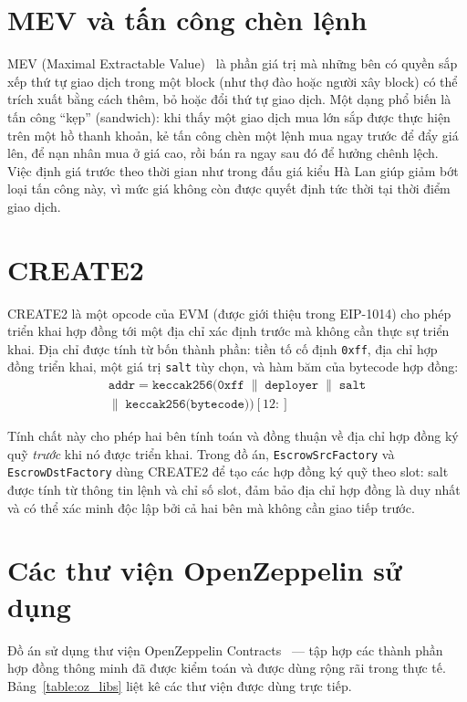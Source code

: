 \documentclass[../DoAn.tex]{subfiles}
\begin{document}
\section{MEV và tấn công chèn lệnh}
\label{apdx:mev}

MEV (Maximal Extractable Value)~\cite{daian2020flashboys, qin2022quantifying} là phần giá trị mà những bên có quyền sắp xếp thứ tự giao dịch trong một block (như thợ đào hoặc người xây block) có thể trích xuất bằng cách thêm, bỏ hoặc đổi thứ tự giao dịch. Một dạng phổ biến là tấn công ``kẹp'' (sandwich): khi thấy một giao dịch mua lớn sắp được thực hiện trên một hồ thanh khoản, kẻ tấn công chèn một lệnh mua ngay trước để đẩy giá lên, để nạn nhân mua ở giá cao, rồi bán ra ngay sau đó để hưởng chênh lệch. Việc định giá trước theo thời gian như trong đấu giá kiểu Hà Lan giúp giảm bớt loại tấn công này, vì mức giá không còn được quyết định tức thời tại thời điểm giao dịch.

\section{CREATE2}
\label{apdx:create2}

CREATE2 là một opcode của EVM (được giới thiệu trong EIP-1014) cho phép triển khai hợp đồng tới một địa chỉ xác định trước mà không cần thực sự triển khai. Địa chỉ được tính từ bốn thành phần: tiền tố cố định \texttt{0xff}, địa chỉ hợp đồng triển khai, một giá trị \texttt{salt} tùy chọn, và hàm băm của bytecode hợp đồng:
\begin{multline}
    \texttt{addr} = \texttt{keccak256}\bigl(\texttt{0xff} \;\|\; \texttt{deployer} \;\|\; \texttt{salt}\\
    \|\; \texttt{keccak256(bytecode)}\bigr)[12:]
\end{multline}

Tính chất này cho phép hai bên tính toán và đồng thuận về địa chỉ hợp đồng ký quỹ \emph{trước} khi nó được triển khai. Trong đồ án, \texttt{EscrowSrcFactory} và \texttt{EscrowDstFactory} dùng CREATE2 để tạo các hợp đồng ký quỹ theo slot: salt được tính từ thông tin lệnh và chỉ số slot, đảm bảo địa chỉ hợp đồng là duy nhất và có thể xác minh độc lập bởi cả hai bên mà không cần giao tiếp trước.

\section{Các thư viện OpenZeppelin sử dụng}
\label{apdx:openzeppelin}

Đồ án sử dụng thư viện OpenZeppelin Contracts~\cite{openzeppelin_contracts} — tập hợp các thành phần hợp đồng thông minh đã được kiểm toán và được dùng rộng rãi trong thực tế. Bảng~\ref{table:oz_libs} liệt kê các thư viện được dùng trực tiếp.
\end{document}
